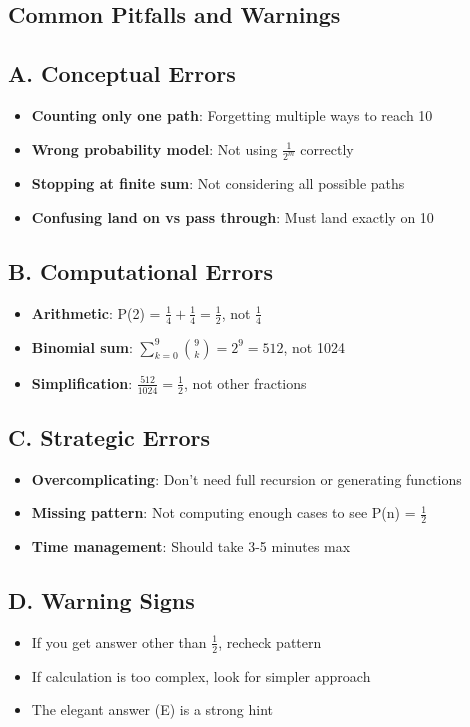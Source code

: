 \documentclass[11pt]{article}
\begin{document}
\begin{pitfallbox}
\section*{Common Pitfalls and Warnings}

\subsection*{A. Conceptual Errors}
\begin{itemize}[leftmargin=*]
    \item \textbf{Counting only one path}: Forgetting multiple ways to reach 10
    \item \textbf{Wrong probability model}: Not using $\frac{1}{2^m}$ correctly
    \item \textbf{Stopping at finite sum}: Not considering all possible paths
    \item \textbf{Confusing land on vs pass through}: Must land exactly on 10
\end{itemize}

\subsection*{B. Computational Errors}
\begin{itemize}[leftmargin=*]
    \item \textbf{Arithmetic}: P(2) = $\frac{1}{4} + \frac{1}{4} = \frac{1}{2}$, not $\frac{1}{4}$
    \item \textbf{Binomial sum}: $\sum_{k=0}^{9} \binom{9}{k} = 2^9 = 512$, not 1024
    \item \textbf{Simplification}: $\frac{512}{1024} = \frac{1}{2}$, not other fractions
\end{itemize}

\subsection*{C. Strategic Errors}
\begin{itemize}[leftmargin=*]
    \item \textbf{Overcomplicating}: Don't need full recursion or generating functions
    \item \textbf{Missing pattern}: Not computing enough cases to see P(n) = $\frac{1}{2}$
    \item \textbf{Time management}: Should take 3-5 minutes max
\end{itemize}

\subsection*{D. Warning Signs}
\begin{itemize}[leftmargin=*]
    \item If you get answer other than $\frac{1}{2}$, recheck pattern
    \item If calculation is too complex, look for simpler approach
    \item The elegant answer (E) is a strong hint
\end{itemize}
\end{pitfallbox}
\end{document}
